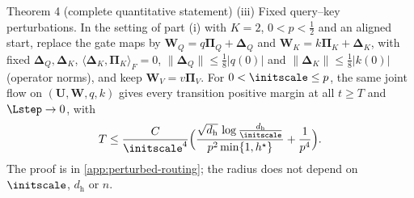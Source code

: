 \begin{restated}{Theorem 4 (complete quantitative statement)}
\textnormal{(iii) Fixed query--key perturbations.} In the setting of part (i) with $K=2$, $0<p<\tfrac12$ and an aligned start, replace the
gate maps by $\mathbf W_Q=q\bm\Pi_Q+\bm\Delta_Q$ and $\mathbf W_K=k\bm\Pi_K+\bm\Delta_K$, with fixed $\bm\Delta_Q,\bm\Delta_K$,
$\langle\bm\Delta_K,\bm\Pi_K\rangle_F=0$, $\|\bm\Delta_Q\|\le\tfrac18|q(0)|$ and $\|\bm\Delta_K\|\le\tfrac18|k(0)|$ (operator norms), and keep
$\mathbf W_V=v\bm\Pi_V$. For $0<\initscale\le p$, the same joint flow on $(\mathbf U,\mathbf W,q,k)$ gives every transition positive margin at all
$t\ge T$ and $\Lstep\to0$, with
\[
 T\le\frac{C}{\initscale^4}\Bigl(\frac{\sqrt{d_{\mathrm h}}\,\log\frac{d_{\mathrm h}}{\initscale}}{p^2\min\{1,h^\star\}}+\frac1{p^4}\Bigr).
\]
The proof is in \cref{app:perturbed-routing}; the radius does not depend on $\initscale$, $d_{\mathrm h}$ or $n$.
\end{restated}